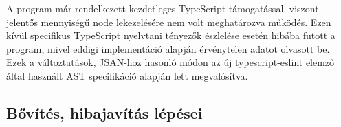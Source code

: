 A program már rendelkezett kezdetleges TypeScript támogatással, viszont jelentős mennyiségű node lekezelésére nem volt meghatározva működés. Ezen kívül specifikus TypeScript nyelvtani tényezők észlelése esetén hibába futott a program, mivel eddigi implementáció alapján érvénytelen adatot olvasott be. Ezek a változtatások, JSAN-hoz hasonló módon az új typescript-eslint elemző által használt AST specifikáció alapján lett megvalósítva.

\subsection{Bővítés, hibajavítás lépései}


